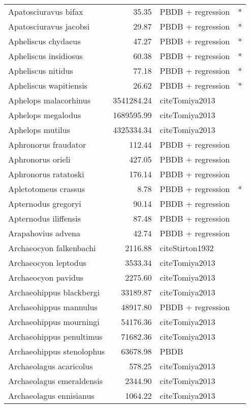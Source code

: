 \begin{table}[ht]
\begin{tabular}{lrll}
  Apatosciuravus bifax & 35.35 & PBDB + regression & * \\ 
  Apatosciuravus jacobsi & 29.87 & PBDB + regression & * \\ 
  Apheliscus chydaeus & 47.27 & PBDB + regression & * \\ 
  Apheliscus insidiosus & 60.38 & PBDB + regression & * \\ 
  Apheliscus nitidus & 77.18 & PBDB + regression & * \\ 
  Apheliscus wapitiensis & 26.62 & PBDB + regression & * \\ 
  Aphelops malacorhinus & 3541284.24 & cite{Tomiya2013} &  \\ 
  Aphelops megalodus & 1689595.99 & cite{Tomiya2013} &  \\ 
  Aphelops mutilus & 4325334.34 & cite{Tomiya2013} &  \\ 
  Aphronorus fraudator & 112.44 & PBDB + regression &  \\ 
  Aphronorus orieli & 427.05 & PBDB + regression &  \\ 
  Aphronorus ratatoski & 176.14 & PBDB + regression &  \\ 
  Apletotomeus crassus & 8.78 & PBDB + regression & * \\ 
  Apternodus gregoryi & 90.14 & PBDB + regression &  \\ 
  Apternodus iliffensis & 87.48 & PBDB + regression &  \\ 
  Arapahovius advena & 42.74 & PBDB + regression &  \\ 
  Archaeocyon falkenbachi & 2116.88 & cite{Stirton1932} &  \\ 
  Archaeocyon leptodus & 3533.34 & cite{Tomiya2013} &  \\ 
  Archaeocyon pavidus & 2275.60 & cite{Tomiya2013} &  \\ 
  Archaeohippus blackbergi & 33189.87 & cite{Tomiya2013} &  \\ 
  Archaeohippus mannulus & 48917.80 & PBDB + regression &  \\ 
  Archaeohippus mourningi & 54176.36 & cite{Tomiya2013} &  \\ 
  Archaeohippus penultimus & 71682.36 & cite{Tomiya2013} &  \\ 
  Archaeohippus stenolophus & 63678.98 & PBDB &  \\ 
  Archaeolagus acaricolus & 578.25 & cite{Tomiya2013} &  \\ 
  Archaeolagus emeraldensis & 2344.90 & cite{Tomiya2013} &  \\ 
  Archaeolagus ennisianus & 1064.22 & cite{Tomiya2013} &  \\ 

\end{tabular}
\end{table}
